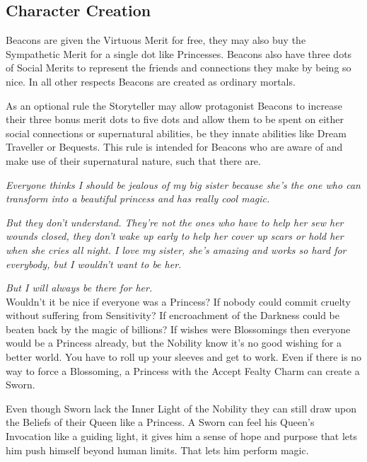 \subsection*{Character Creation}

Beacons are given the Virtuous Merit for free, they may also buy the Sympathetic Merit for a single dot like Princesses. Beacons also have three dots of Social Merits to represent the friends and connections they make by being so nice. In all other respects Beacons are created as ordinary mortals.

As an optional rule the Storyteller may allow protagonist Beacons to increase their three bonus merit dots to five dots and allow them to be spent on either social connections or supernatural abilities, be they innate abilities like Dream Traveller or Bequests. This rule is intended for Beacons who are aware of and make use of their supernatural nature, such that there are.

\newpage{}

\noindent \textit{Everyone thinks I should be jealous of my big sister because she's the one who can transform into a beautiful princess and has really cool magic.}

\textit{But they don't understand. They're not the ones who have to help her sew her wounds closed, they don't wake up early to help her cover up scars or hold her when she cries all night. I love my sister, she's amazing and works so hard for everybody, but I wouldn't want to be her.}

\textit{But I will always be there for her.}\\

\noindent Wouldn’t it be nice if everyone was a Princess? If nobody could commit cruelty without suffering from Sensitivity? If encroachment of the Darkness could be beaten back by the magic of billions? If wishes were Blossomings then everyone would be a Princess already, but the Nobility know it’s no good wishing for a better world. You have to roll up your sleeves and get to work. Even if there is no way to force a Blossoming, a Princess with the Accept Fealty Charm can create a Sworn.

Even though Sworn lack the Inner Light of the Nobility they can still draw upon the Beliefs of their Queen like a Princess. A Sworn can feel his Queen's Invocation like a guiding light, it gives him a sense of hope and purpose that lets him push himself beyond human limits. That lets him perform magic. 

